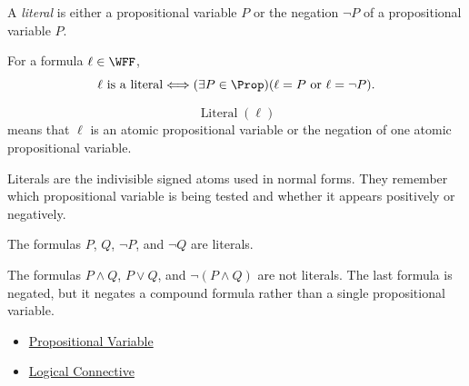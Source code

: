 \begin{tcolorbox}[colback=propbox, colframe=propborder, arc=2pt,
  left=6pt, right=6pt, top=4pt, bottom=4pt,
  title={\small\textbf{Definition (Literal)}},
  fonttitle=\small\bfseries]
\begin{definition}[Literal]
\label{def:literal-propositional-logic}
A \emph{literal} is either a propositional variable \(P\) or the negation
\(\neg P\) of a propositional variable \(P\).
\end{definition}
\end{tcolorbox}

\begin{remark*}
For a formula \(\ell\in\WFF\),
\[
\ell\text{ is a literal}
\Longleftrightarrow
(\exists P\in\Prop)(\ell=P\text{ or }\ell=\neg P).
\]
\end{remark*}

\begin{remark*}
\[
\operatorname{Literal}(\ell)
\]
means that \(\ell\) is an atomic propositional variable or the negation of one
atomic propositional variable.
\end{remark*}

\begin{remark*}[Interpretation]
Literals are the indivisible signed atoms used in normal forms. They remember
which propositional variable is being tested and whether it appears positively
or negatively.
\end{remark*}

\begin{remark*}[Examples]
The formulas \(P\), \(Q\), \(\neg P\), and \(\neg Q\) are literals.
\end{remark*}

\begin{remark*}
The formulas \(P\land Q\), \(P\lor Q\), and \(\neg(P\land Q)\) are not
literals. The last formula is negated, but it negates a compound formula rather
than a single propositional variable.
\end{remark*}

\begin{dependencies}
\begin{itemize}
  \item \hyperref[def:propositional-variable]{Propositional Variable}
  \item \hyperref[def:logical-connective]{Logical Connective}
\end{itemize}
\end{dependencies}


